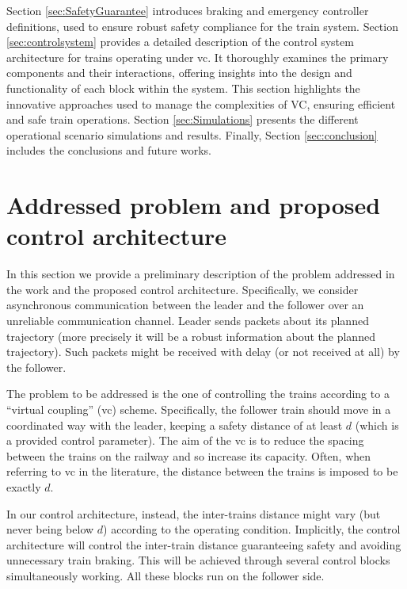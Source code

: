 Section \ref{sec:SafetyGuarantee} introduces braking and emergency controller definitions, used to ensure robust safety compliance for the train system.
Section \ref{sec:controlsystem} provides a detailed description of the control system architecture for trains operating under \gls{vc}. It thoroughly examines the primary components and their interactions, offering insights into the design and functionality of each block within the system. This section highlights the innovative approaches used to manage the complexities of VC, ensuring efficient and safe train operations. Section \ref{sec:Simulations} presents the different operational scenario simulations
and results. Finally, Section \ref{sec:conclusion} includes the conclusions and future works.









\section{Addressed problem and proposed control architecture}
\label{sec:proposedarchitecture}


In this section we provide a preliminary description of the problem addressed in the work and the proposed control architecture. 
Specifically, we consider asynchronous communication between the leader and the follower over an unreliable communication channel. 
Leader sends packets about its planned trajectory (more precisely it will be a robust information about the planned trajectory). Such packets might be received with delay (or not received at all) by the follower. 

The problem to be addressed is the one of controlling the trains according to a ``virtual coupling'' (\gls{vc}) scheme. Specifically, the follower train should move in a coordinated way with the leader, keeping a safety distance of at least $d$ (which is a provided control parameter). The aim of the \gls{vc} is to reduce the spacing between the trains on the railway and so increase its capacity. 
Often, when referring to \gls{vc} in the literature, the distance between the trains is imposed to be exactly $d$. 

In our control architecture, instead, the inter-trains distance might vary (but never being below $d$) according to the operating condition. Implicitly, the control architecture will  control the inter-train distance guaranteeing safety and avoiding unnecessary train braking. 
This will be achieved through several control blocks simultaneously working. All these blocks run on the follower side. 

